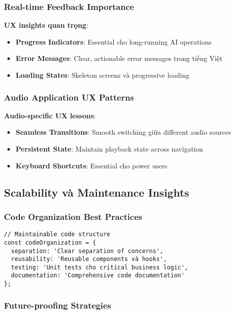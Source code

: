 \documentclass[12pt,a4paper]{article}
\begin{document}
\subsubsection{Real-time Feedback Importance}

\textbf{UX insights quan trọng}:
\begin{itemize}
\item \textbf{Progress Indicators}: Essential cho long-running AI operations
\item \textbf{Error Messages}: Clear, actionable error messages trong tiếng Việt
\item \textbf{Loading States}: Skeleton screens và progressive loading
\end{itemize}

\subsubsection{Audio Application UX Patterns}

\textbf{Audio-specific UX lessons}:
\begin{itemize}
\item \textbf{Seamless Transitions}: Smooth switching giữa different audio sources
\item \textbf{Persistent State}: Maintain playback state across navigation
\item \textbf{Keyboard Shortcuts}: Essential cho power users
\end{itemize}

\subsection{Scalability và Maintenance Insights}

\subsubsection{Code Organization Best Practices}

\begin{lstlisting}[caption={Maintainable code structure}]
// Maintainable code structure
const codeOrganization = {
  separation: 'Clear separation of concerns',
  reusability: 'Reusable components và hooks',
  testing: 'Unit tests cho critical business logic',
  documentation: 'Comprehensive code documentation'
};
\end{lstlisting}

\subsubsection{Future-proofing Strategies}
\end{document}
